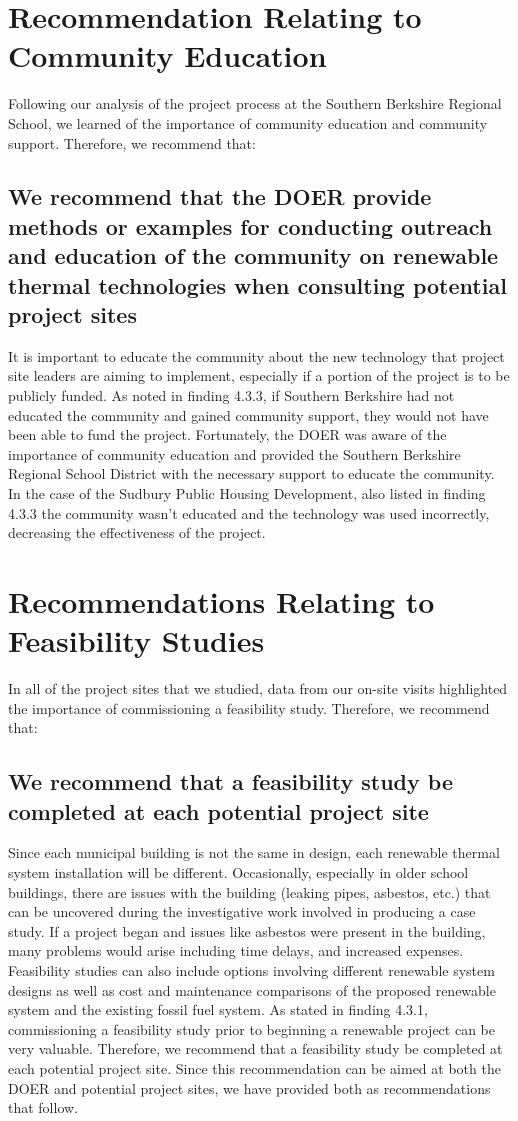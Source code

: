 \section{Recommendation Relating to Community Education}
\par Following our analysis of the project process at the Southern Berkshire Regional School, we learned of the importance of community education and community support. Therefore, we recommend that:
\subsection{We recommend that the DOER provide methods or examples for conducting outreach and education of the community on renewable thermal technologies when consulting potential project sites}
It is important to educate the community about the new technology that project site leaders are aiming to implement, especially if a portion of the project is to be publicly funded. As noted in finding 4.3.3, if Southern Berkshire had not educated the community and gained community support, they would not have been able to fund the project. Fortunately, the DOER was aware of the importance of community education and provided the Southern Berkshire Regional School District with the necessary support to educate the community. In the case of the Sudbury Public Housing Development, also listed in finding 4.3.3 the community wasn’t educated and the technology was used incorrectly, decreasing the effectiveness of the project. 

\section{Recommendations Relating to Feasibility Studies}
\par In all of the project sites that we studied, data from our on-site visits highlighted the importance of commissioning a feasibility study. Therefore, we recommend that:
\subsection{We recommend that a feasibility study be completed at each potential project site}
\par Since each municipal building is not the same in design, each renewable thermal system installation will be different. Occasionally, especially in older school buildings, there are issues with the building (leaking pipes, asbestos, etc.) that can be uncovered during the investigative work involved in producing a case study. If a project began and issues like asbestos were present in the building, many problems would arise including time delays, and increased expenses. Feasibility studies can also include options involving different renewable system designs as well as cost and maintenance comparisons of the proposed renewable system and the existing fossil fuel system. As stated in finding 4.3.1, commissioning a feasibility study prior to beginning a renewable project can be very valuable. Therefore, we recommend that a feasibility study be completed at each potential project site. Since this recommendation can be aimed at both the DOER and potential project sites, we have provided both as recommendations that follow.

